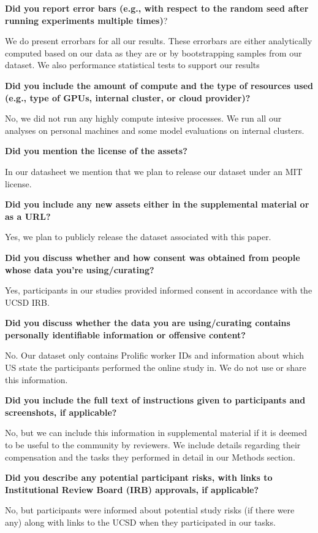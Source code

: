 \documentclass{article}
\begin{document}
\textbf{Did you report error bars (e.g., with respect to the random seed after running experiments multiple times)}?

We do present errorbars for all our results. These errorbars are either analytically computed based on our data as they are or by bootstrapping samples from our dataset. 
We also performance statistical tests to support our results

\textbf{
Did you include the amount of compute and the type of resources used (e.g., type of GPUs, internal cluster, or cloud provider)?}

No, we did not run any highly compute intesive processes. We run all our analyses on personal machines and some model evaluations on internal clusters.

\textbf{ Did you mention the license of the assets?}

In our datasheet we mention that we plan to release our dataset under an MIT license.

\textbf{Did you include any new assets either in the supplemental material or as a URL?}

Yes, we plan to publicly release the dataset associated with this paper.

\textbf{ Did you discuss whether and how consent was obtained from people whose data you're using/curating?}

Yes, participants in our studies provided informed consent in accordance with the UCSD IRB.

\textbf{Did you discuss whether the data you are using/curating contains personally identifiable information or offensive content?}

No. Our dataset only contains Prolific worker IDs and information about which US state the participants performed the online study in. 
We do not use or share this information.

\textbf{Did you include the full text of instructions given to participants and screenshots, if applicable?}

No, but we can include this information in supplemental material if it is deemed to be useful to the community by reviewers.
We include details regarding their compensation and the tasks they performed in detail in our Methods section.

\textbf{ Did you describe any potential participant risks, with links to Institutional Review Board (IRB) approvals, if applicable?}

No, but participants were informed about potential study risks (if there were any) along with links to the UCSD when they participated in our tasks.
\end{document}
